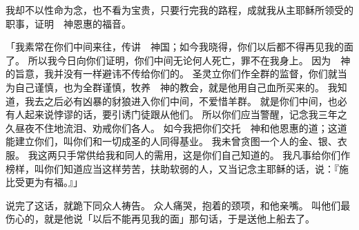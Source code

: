 {我却不以性命为念，也不看为宝贵，只要行完我的路程，成就我从主耶稣所领受的职事，证明　神恩惠的福音。
\par }{\PP {}「我素常在你们中间来往，传讲　神国{}；如今我晓得，你们以后都不得再见我的面了。
所以我今日向你们证明，你们中间无论何人死亡，罪不在我身上。
因为　神的旨意，我并没有一样避讳不传给你们的。
圣灵立你们作全群的监督，你们就当为自己谨慎，也为全群谨慎，牧养　神的教会，就是他用自己血所买来的。
我知道，我去之后必有凶暴的豺狼进入你们中间，不爱惜羊群。
就是你们中间，也必有人起来说悖谬的话，要引诱门徒跟从他们。
所以你们应当警醒，记念我三年之久昼夜不住地流泪、劝戒你们各人。
如今我把你们交托　神和他恩惠的道；这道能建立你们，叫你们和一切成圣的人同得基业。
我未曾贪图一个人的金、银、衣服。
我这两只手常供给我和同人的需用，这是你们自己知道的。
我凡事给你们作榜样，叫你们知道应当这样劳苦，扶助软弱的人，又当记念主耶稣的话，说：『施比受更为有福。』」
\par }{\PP {}说完了这话，就跪下同众人祷告。
众人痛哭，抱着{}的颈项，和他亲嘴。
叫他们最伤心的，就是他说「以后不能再见我的面」那句话，于是送他上船去了。

}
